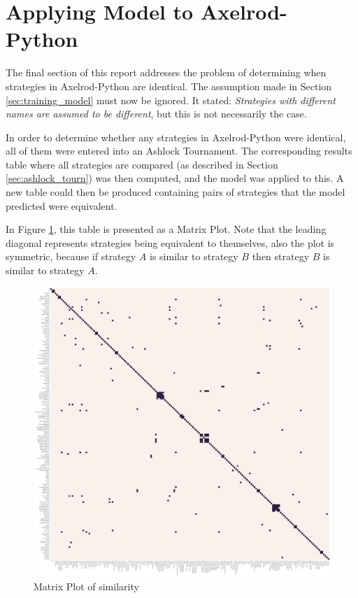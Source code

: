\section{Applying Model to Axelrod-Python}

The final section of this report addresses the problem of determining when strategies in Axelrod-Python are identical.
The assumption made in Section \ref{sec:training_model} must now be ignored.
It stated: \textit{Strategies with different names are assumed to be different}, but this is not necessarily the case.

In order to determine whether any strategies in Axelrod-Python were identical, all of them were entered into an Ashlock Tournament.
The corresponding results table where all strategies are compared (as described in Section \ref{sec:ashlock_tourn}) was then computed, and the model was applied to this.
A new table could then be produced containing pairs of strategies that the model predicted were equivalent.

In Figure \ref{fig:matrix_similarity}, this table is presented as a Matrix Plot.
Note that the leading diagonal represents strategies being equivalent to themselves, also the plot is symmetric, because if strategy $A$ is similar to strategy $B$ then strategy $B$ is similar to strategy $A$.

\begin{figure}[htbp!]
    \centering
    \includegraphics[width=0.8\linewidth]{../img/ML/similarity_heatmap.png}
    \caption{Matrix Plot of similarity}
    \label{fig:matrix_similarity}
\end{figure}

